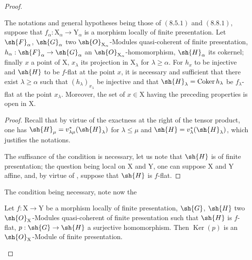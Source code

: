 \begin{proof}
\begin{proposition}[11.3.9]
\label{IV.11.3.9}
The notations and general hypotheses being those of $(8.5.1)$ and $(8.8.1)$, suppose that $f_\alpha:\mathrm{X}_\alpha\to\mathrm{Y}_\alpha$ is a morphism locally of finite presentation. Let $\sh{F}_\alpha$, $\sh{G}_\alpha$ two $\sh{O}_{\mathrm{X}_\alpha}$-Modules quasi-coherent of finite presentation, $h_\alpha:\sh{F}_\alpha\to\sh{G}_\alpha$ an $\sh{O}_{\mathrm{X}_\alpha}$-homomorphism, $\sh{H}_\alpha$ its cokernel; finally $x$ a point of $\mathrm{X}$, $x_\lambda$ its projection in $\mathrm{X}_\lambda$ for $\lambda\geqslant\alpha$. For $h_x$ to be injective and $\sh{H}$ to be $f$-flat at the point $x$, it is necessary and sufficient that there exist $\lambda\geqslant\alpha$ such that $(h_\lambda)_{x_\lambda}$ be injective and that $\sh{H}_\lambda=\operatorname{Coker} h_\lambda$ be $f_\lambda$-flat at the point $x_\lambda$. Moreover, the set of $x\in\mathrm{X}$ having the preceding properties is open in $\mathrm{X}$.
\end{proposition}

\begin{proof}
Recall that by virtue of the exactness at the right of the tensor product, one has $\sh{H}_\mu=v^*_{\lambda\mu}(\sh{H}_\lambda)$ for $\lambda\leqslant\mu$ and $\sh{H}=v^*_\lambda(\sh{H}_\lambda)$, which justifies the notations.

The suffisance of the condition is necessary, let us note that $\sh{H}$ is of finite presentation; the question being local on $\mathrm{X}$ and $\mathrm{Y}$, one can suppose $\mathrm{X}$ and $\mathrm{Y}$ affine, and, by virtue of , suppose that $\sh{H}$ is $f$-flat.
\end{proof}


The condition being necessary, note now the

\begin{lemma}[11.3.9.1]
\label{IV.11.3.9.1}
Let $f:\mathrm{X}\to\mathrm{Y}$ be a morphism locally of finite presentation, $\sh{G}$, $\sh{H}$ two $\sh{O}_\mathrm{X}$-Modules quasi-coherent of finite presentation such that $\sh{H}$ is $f$-flat, $p:\sh{G}\to\sh{H}$ a surjective homomorphism. Then $\operatorname{Ker}(p)$ is an $\sh{O}_\mathrm{X}$-Module of finite presentation.
\end{lemma}


\end{proof}
